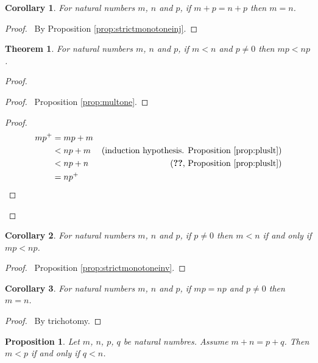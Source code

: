 \documentclass{book}
\let\qed\relax
\newtheorem{prop}[ax]{Proposition}
\newtheorem{cor}{Corollary}[ax]
\newtheorem{thm}[ax]{Theorem}
\theoremstyle{definition}
\begin{document}
\begin{cor}
\label{cor:pluscancel}
For natural numbers $m$, $n$ and $p$, if $m + p = n + p$ then $m = n$.
\end{cor}

\begin{proof}
\pf\ By Proposition \ref{prop:strictmonotoneinj}.
\end{proof}

\begin{thm}
For natural numbers $m$, $n$ and $p$, if $m < n$ and $p \neq 0$ then $mp < np$.
\end{thm}

\begin{proof}
\pf
{}
\begin{proof}
	\pf\ Proposition \ref{prop:multone}.
\end{proof}
\begin{proof}
	\pf
	\begin{align*}
		mp^+ & = mp + m \\
		& < np + m & (\text{induction hypothesis. Proposition \ref{prop:pluslt}}) \\
		& < np + n & (\text{\stepref{2}, Proposition \ref{prop:pluslt}}) \\
		& = np^+
	\end{align*}
\end{proof}
\qed
\end{proof}

\begin{cor}
For natural numbers $m$, $n$ and $p$, if $p \neq 0$ then $m < n$ if and only if $mp < np$.
\end{cor}

\begin{proof}
	\pf\ Proposition \ref{prop:strictmonotoneinv}. \qed
\end{proof}

\begin{cor}
For natural numbers $m$, $n$ and $p$, if $mp = np$ and $p \neq 0$ then $m = n$.
\end{cor}

\begin{proof}
	\pf\ By trichotomy. \qed
\end{proof}

\begin{prop}
\label{prop:intltlemma}
Let $m$, $n$, $p$, $q$ be natural numbres. Assume $m + n = p + q$. Then $m < p$ if and only if $q < n$.
\end{prop}
\end{document}
